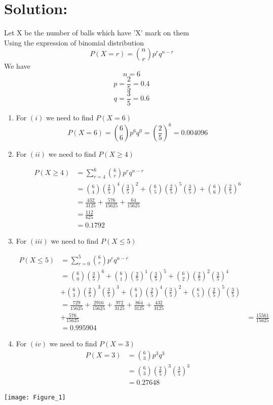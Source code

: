 \documentclass[journal,12pt,twocolumn]{IEEEtran}
\begin{document}
\section*{Solution:}
Let X be the number of balls which have 'X' mark on them\\
Using the expression of binomial distribution
\[P(X = r) = {n \choose r} p^r q^{n-r}\]
We have
\[n = 6\]
\[p = \frac{2}{5} = 0.4\] 
\[q = \frac{3}{5} = 0.6\] 
\begin{enumerate}
    \item For \((i)\) we need to find \(P(X = 6)\)
\[P(X = 6) = {6 \choose 6} p^6 q^0 = \left(\frac{2}{5} \right)^6 = 0.004096\]

\item For \((ii)\) we need to find \(P(X \geq 4)\)

\begin{align*}
    P(X \geq 4)  &= \sum_{r = 4}^6 {6 \choose r} p^r q^{n-r}\\
    &= {6 \choose 4} \left(\frac{2}{5} \right)^4 \left(\frac{3}{5} \right)^2 + {6 \choose 5} \left(\frac{2}{5} \right)^5 \left(\frac{3}{5} \right) + {6 \choose 6} \left(\frac{2}{5} \right)^6\\
    &=\frac{432}{3125} + \frac{576}{15625} + \frac{64}{15625}\\
    &= \frac{112}{625} \\
    &= 0.1792
\end{align*}




\item 
For \((iii)\) we need to find \(P(X \leq 5)\)

\begin{align*}
    P(X \leq 5) &= \sum_{r = 0}^5 {6 \choose r} p^r q^{n - r}\\
    &= {6 \choose 0} \left(\frac{3}{5} \right)^6 + {6 \choose 1} \left(\frac{2}{5} \right)^1 \left(\frac{3}{5} \right)^5 + {6 \choose 2} \left(\frac{2}{5} \right)^2 \left(\frac{3}{5} \right)^4 \\
    & +{6 \choose 3} \left(\frac{2}{5} \right)^3 \left(\frac{3}{5} \right)^3+ {6 \choose 4} \left(\frac{2}{5} \right)^4 \left(\frac{3}{5} \right)^2 + {6 \choose 5} \left(\frac{2}{5} \right)^5 \left(\frac{3}{5} \right)\\
    &= \frac{729}{15625} + \frac{2916}{15625} + \frac{972}{3125} + \frac{864}{3125} + \frac{432}{3125} \\
    &+ \frac{576}{15625}
    &= \frac{15561}{15625} \\
    &= 0.995904
\end{align*}


\item For \((iv)\) we need to find \(P(X = 3)\)
\begin{align*}
    P(X = 3) &= {6 \choose 3} p^3 q^3\\
    &={6 \choose 3} \left(\frac{2}{5} \right)^3 \left(\frac{3}{5} \right)^3 \\
    &= 0.27648
\end{align*}

\end{enumerate}

\texttt{[image: Figure\_1]}
\end{document}
